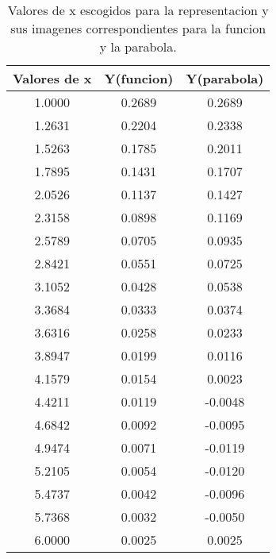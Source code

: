\begin{table}[!ht]
\begin{center}
\begin{tabular}{|c|c|c|} \hline 
\textbf{Valores de x} & \textbf{Y(funcion)} & \textbf{Y(parabola)} \\ \hline \hline
1.0000 & 0.2689 & 0.2689
\\
\hline

1.2631 & 0.2204 & 0.2338
\\
\hline

1.5263 & 0.1785 & 0.2011
\\
\hline

1.7895 & 0.1431 & 0.1707
\\
\hline

2.0526 & 0.1137 & 0.1427
\\
\hline

2.3158 & 0.0898 & 0.1169
\\
\hline

2.5789 & 0.0705 & 0.0935
\\
\hline

2.8421 & 0.0551 & 0.0725
\\
\hline

3.1052 & 0.0428 & 0.0538
\\
\hline

3.3684 & 0.0333 & 0.0374
\\
\hline

3.6316 & 0.0258 & 0.0233
\\
\hline

3.8947 & 0.0199 & 0.0116
\\
\hline

4.1579 & 0.0154 & 0.0023
\\
\hline

4.4211 & 0.0119 & -0.0048
\\
\hline

4.6842 & 0.0092 & -0.0095
\\
\hline

4.9474 & 0.0071 & -0.0119
\\
\hline

5.2105 & 0.0054 & -0.0120
\\
\hline

5.4737 & 0.0042 & -0.0096
\\
\hline

5.7368 & 0.0032 & -0.0050
\\
\hline

6.0000 & 0.0025 & 0.0025
\\
\hline
\end{tabular}
\end{center}
\caption{Valores de x escogidos para la representacion y sus imagenes correspondientes para la funcion y la parabola.}
\label{tab:1}
\end{table}

